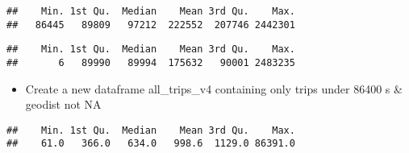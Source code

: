 \documentclass[
]{article}
\newenvironment{Shaded}{\begin{snugshade}}{\end{snugshade}}
\newcommand{\DecValTok}[1]{\textcolor[rgb]{0.00,0.00,0.81}{#1}}
\newcommand{\FunctionTok}[1]{\textcolor[rgb]{0.00,0.00,0.00}{#1}}
\newcommand{\NormalTok}[1]{#1}
\newcommand{\OtherTok}[1]{\textcolor[rgb]{0.56,0.35,0.01}{#1}}
\newcommand{\SpecialCharTok}[1]{\textcolor[rgb]{0.00,0.00,0.00}{#1}}
\providecommand{\tightlist}{%
  \setlength{\itemsep}{0pt}\setlength{\parskip}{0pt}}
\begin{document}
\begin{verbatim}
##    Min. 1st Qu.  Median    Mean 3rd Qu.    Max. 
##   86445   89809   97212  222552  207746 2442301
\end{verbatim}

\begin{Shaded}
\end{Shaded}

\begin{verbatim}
##    Min. 1st Qu.  Median    Mean 3rd Qu.    Max. 
##       6   89990   89994  175632   90001 2483235
\end{verbatim}

\fontsize{10}{12}
\selectfont

\begin{itemize}
\tightlist
\item
  Create a new dataframe all\_trips\_v4 containing only trips under
  86400 s \& geodist not NA
\end{itemize}

\fontsize{9}{11}
\selectfont

\begin{Shaded}
\end{Shaded}

\begin{verbatim}
##    Min. 1st Qu.  Median    Mean 3rd Qu.    Max. 
##    61.0   366.0   634.0   998.6  1129.0 86391.0
\end{verbatim}

\fontsize{10}{12}
\selectfont
\end{document}
